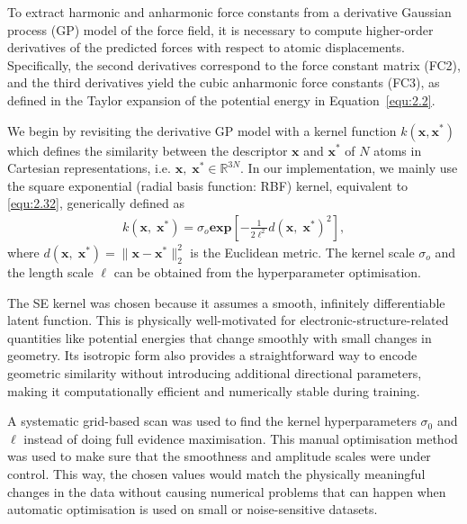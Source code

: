 To extract harmonic and anharmonic force constants from a derivative Gaussian process (GP) model of the force field, it is necessary to compute higher-order derivatives of the predicted forces with respect to atomic displacements. Specifically, the second derivatives correspond to the force constant matrix (FC2), and the third derivatives yield the cubic anharmonic force constants (FC3), as defined in the Taylor expansion of the potential energy in Equation~\eqref{equ:2.2}. 

We begin by revisiting the derivative GP model with a kernel function $k(\mathbf{x},\mathbf{x}^{*})$ which defines the similarity between the descriptor $\mathbf{x}$ and $\mathbf{x}^{*}$ of $N$ atoms in Cartesian representations, i.e. $\mathbf{x},\;\mathbf{x}^{*}\in\mathbb{R}^{3N}$.
In our implementation, we mainly use the square exponential (radial basis function: RBF) kernel, equivalent to \eqref{equ:2.32}, generically defined as
\begin{equation} \label{equ:3.1}
        \begin{split}
            k(\mathbf{x},\;\mathbf{x}^{*})= \sigma_{o}\mathbf{exp}\left[-\frac{1}{2\ell^{2}}d(\mathbf{x},\;\mathbf{x}^{*})^{2}\right],
        \end{split}
\end{equation}
where $d(\mathbf{x},\;\mathbf{x}^{*})=\lVert\mathbf{x}-\mathbf{x}^{*}\rVert^{2}_{2}$ is the Euclidean metric.
The kernel scale $\sigma_{o}$ and the length scale $\ell$ can be obtained from the hyperparameter optimisation.

The SE kernel was chosen because it assumes a smooth, infinitely differentiable latent function. This is physically well-motivated for electronic-structure-related quantities like potential energies that change smoothly with small changes in geometry. 
Its isotropic form also provides a straightforward way to encode geometric similarity without introducing additional directional parameters, making it computationally efficient and numerically stable during training.

A systematic grid-based scan was used to find the kernel hyperparameters $\sigma_{0}$ and $\ell$ instead of doing full evidence maximisation. 
This manual optimisation method was used to make sure that the smoothness and amplitude scales were under control. This way, the chosen values would match the physically meaningful changes in the data without causing numerical problems that can happen when automatic optimisation is used on small or noise-sensitive datasets.

